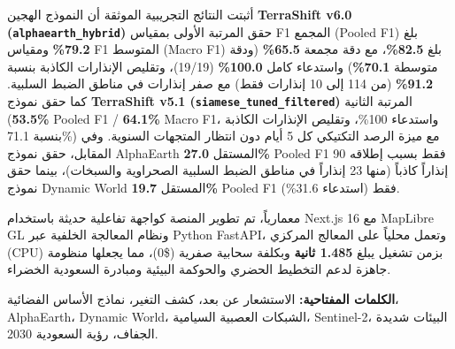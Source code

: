 أثبتت النتائج التجريبية الموثقة أن النموذج الهجين \textbf{TerraShift v6.0 (\texttt{alphaearth\_hybrid})} حقق المرتبة الأولى بمقياس F1 المجمع (Pooled F1) بلغ \textbf{79.2\%} ومقياس F1 المتوسط (Macro F1) بلغ \textbf{82.5\%}، مع دقة مجمعة \textbf{65.5\%} (ودقة متوسطة \textbf{70.1\%}) واستدعاء كامل \textbf{100.0\%} (19/19)، وتقليص الإنذارات الكاذبة بنسبة \textbf{91.2\%} (من 114 إلى 10 إنذارات فقط) مع صفر إنذارات في مناطق الضبط السلبية. كما حقق نموذج \textbf{TerraShift v5.1 (\texttt{siamese\_tuned\_filtered})} المرتبة الثانية (\textbf{53.5\%} Pooled F1 / \textbf{64.1\%} Macro F1، واستدعاء 100\%، وتقليص الإنذارات الكاذبة بنسبة 71.1\%) مع ميزة الرصد التكتيكي كل 5 أيام دون انتظار المتجهات السنوية. وفي المقابل، حقق نموذج AlphaEarth المستقل \textbf{27.0\%} Pooled F1 فقط بسبب إطلاقه 90 إنذاراً كاذباً (منها 23 إنذاراً في مناطق الضبط السلبية الصحراوية والسبخات)، بينما حقق نموذج Dynamic World المستقل \textbf{19.7\%} Pooled F1 فقط (استدعاء 31.6\%).

معمارياً، تم تطوير المنصة كواجهة تفاعلية حديثة باستخدام Next.js 16 مع MapLibre GL ونظام المعالجة الخلفية عبر Python FastAPI، وتعمل محلياً على المعالج المركزي (CPU) بزمن تشغيل يبلغ \textbf{1.485 ثانية} وبكلفة سحابية صفرية (\$0)، مما يجعلها منظومة جاهزة لدعم التخطيط الحضري والحوكمة البيئية ومبادرة السعودية الخضراء.

\vspace*{0.8cm}
\noindent
\textbf{الكلمات المفتاحية:} الاستشعار عن بعد، كشف التغير، نماذج الأساس الفضائية، AlphaEarth، Dynamic World، الشبكات العصبية السيامية، Sentinel-2، البيئات شديدة الجفاف، رؤية السعودية 2030.
\newpage
